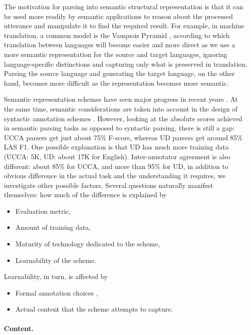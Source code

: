 \documentclass[11pt,a4paper]{article}
\begin{document}
The motivation for parsing into semantic structural representation is that it can be used more readily
by semantic applications to reason about the processed utterance and manipulate it to find the required
result.
For example, in machine translation, a common model is the Vauquois Pyramid 
\cite{vauquois1968survey},
according to which translation between languages will become easier and more direct as we use
a more semantic representation for the source and target languages,
ignoring language-specific distinctions and capturing only what is preserved in translation.
Parsing the source language and generating the target language, on the other hand, becomes more
difficult as the representation becomes more semantic.

Semantic representation schemes have seen major progress in recent years \cite{abend2017state}.
At the same time, semantic considerations are taken into account in the design of syntactic annotation schemes
\cite{przepiorkowski2018arguments}.
However, looking at the absolute scores achieved in semantic parsing tasks
as opposed to syntactic parsing,
there is still a gap:
UCCA parsers get just about 75\% F-score, whereas UD parsers get around 85\% LAS F1.
One possible explanation is that
UD has much more training data (UCCA: 5K, UD: about 17K for English).
Inter-annotator agreement is also different: about 85\% for UCCA, and more than 95\% for UD,
in addition to obvious difference in the actual task and the understanding it requires,
we investigate other possible factors.
Several questions naturally manifest themselves:
how much of the difference is explained by
\begin{itemize}
\item Evaluation metric,
\item Amount of training data,
\item Maturity of technology dedicated to the scheme,
\item Learnability of the scheme.
\end{itemize}

Learnability, in turn, is affected by
\begin{itemize}
\item Formal annotation choices \cite{Schwartz:12},
\item Actual content that the scheme attempts to capture.
\end{itemize}


\paragraph{Content.}
\end{document}
